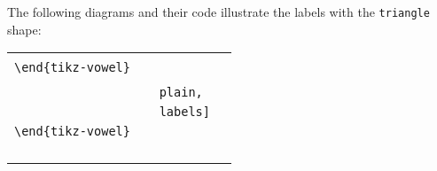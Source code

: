 \documentclass{article}
\begin{document}
\noindent
The following diagrams and their code illustrate the labels with the \texttt{triangle} shape:

\begin{center}
\begin{tabular}{ll}
  \begin{minipage}[t]{6.5cm}{\small
    \verb|\begin{tikz-vowel}[triangle,labels]|\\
    \verb|\end{tikz-vowel}|\\}
  \end{minipage} &
  \begin{minipage}[t]{6.5cm}{\small
    \verb|\begin{tikz-vowel}[triangle,|\\
    \verb|                    plain,|\\
    \verb|                    labels]|\\
    \verb|\end{tikz-vowel}|\\}
  \end{minipage} \\
  \begin{minipage}[t]{6.5cm}{
  \hspace*{-1.75cm}
  \begin{tikz-vowel}\end{tikz-vowel} \\}\end{minipage} &
  \begin{minipage}[t]{6.5cm}{
  \hspace*{-1.5cm}
  \begin{tikz-vowel}\end{tikz-vowel} \\}\end{minipage}
\end{tabular}

\vskip 18pt


\end{center}
\end{document}
